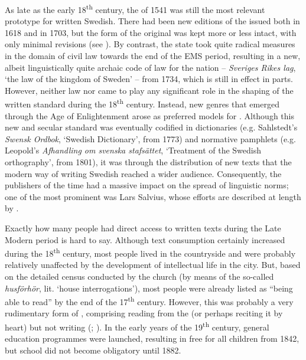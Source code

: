 \documentclass[output=paper]{langscibook}
\begin{document}
As late as the early 18\textsuperscript{th} century, the  of 1541 was still the most relevant prototype for written Swedish. There had been new editions of the  issued both in 1618 and in 1703, but the form of the original was kept more or less intact, with only minimal revisions (see \citealt{Platzack2005gamla}). By contrast, the state took quite radical measures in the domain of civil law towards the end of the EMS period, resulting in a new, albeit linguistically quite archaic \citep{Wessen1965} code of law for the nation – \textit{Sveriges Rikes lag}, ‘the law of the kingdom of Sweden’ – from 1734, which is still in effect in parts. However, neither law nor  came to play any significant role in the shaping of the written standard during the 18\textsuperscript{th} century. Instead, new genres that emerged through the Age of Enlightenment arose as preferred models for . Although this new and secular standard was eventually codified in dictionaries (e.g. Sahlstedt’s \textit{Swensk Ordbok}, ‘Swedish Dictionary’, from 1773) and normative pamphlets (e.g. Leopold’s \textit{Afhandling om svenska stafsättet}, ‘Treatment of the Swedish orthography’, from 1801), it was through the distribution of new texts that the modern way of writing Swedish reached a wider audience. Consequently, the  publishers of the time had a massive impact on the spread of linguistic norms; one of the most prominent was Lars Salvius, whose efforts are described at length by \citet{Santesson1986}.



Exactly how many people had direct access to written texts during the Late Modern period is hard to say. Although text consumption certainly increased during the 18\textsuperscript{th} century, most people lived in the countryside and were probably relatively unaffected by the development of intellectual life in the city. But, based on the detailed census conducted by the church (by means of the so-called \textit{husförhör}, lit. ‘house interrogations’), most people were already listed as “being able to read” by the end of the 17\textsuperscript{th} century. However, this was probably a very rudimentary form of , comprising reading from the  (or perhaps reciting it by heart) but not writing (\citealt{Johansson1981}; \citealt{Berg1994}). In the early years of the 19\textsuperscript{th} century, general education programmes were launched, resulting in free  for all children from 1842, but school did not become obligatory until 1882.
\end{document}
